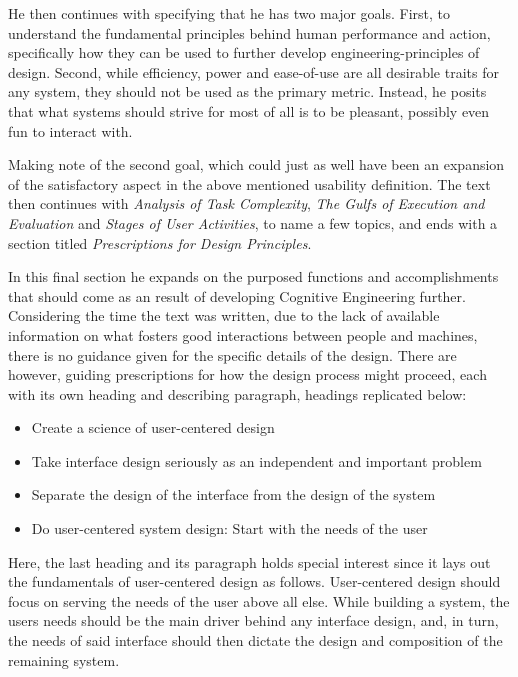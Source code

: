 He then continues with
specifying that he has two major goals. First, to understand the fundamental
principles behind human performance and action, specifically how they can be
used to further develop engineering-principles of design.
Second, while efficiency, power and ease-of-use are all desirable traits for
any system, they should not be used as the primary metric. Instead, he posits
that what systems should strive for most of all is to be pleasant, possibly
even fun to interact with.

Making note of the second goal, which could just as well have been an expansion
of the satisfactory aspect in the above mentioned usability definition. The
text then continues with
\textit{Analysis of Task Complexity},
\textit{The Gulfs of Execution and Evaluation} and
\textit{Stages of User Activities}, to name a few topics, and ends with
a section titled \textit{Prescriptions for Design Principles}.

In this final section he expands on the purposed functions and
accomplishments that should come as an result of developing Cognitive
Engineering further.
Considering the time the text was written, due to the lack of available
information on what fosters good interactions between people and machines,
there is no guidance given for the specific details of the design. There are
however, guiding prescriptions for how the design process might proceed\cite[p.
59-61]{citeUserCenteredNorman}, each with its own heading and describing
paragraph, headings replicated below:

\begin{itemize}
 \item{Create a science of user-centered design}
 \item{Take interface design seriously as an independent and important problem}
 \item{Separate the design of the interface from the design of the system}
 \item{Do user-centered system design: Start with the needs of the user}
\end{itemize}

Here, the last heading and its paragraph holds special interest since it lays
out the fundamentals of user-centered design as follows. User-centered design
should focus on serving the needs of the user above all else. While building a
system, the users needs should be the main driver behind any interface design,
and, in turn, the needs of said interface should then dictate the design and
composition of the remaining system.

